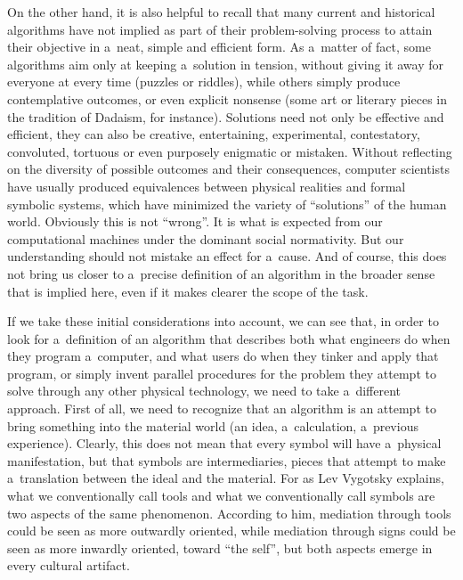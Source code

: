 On the other hand, it is also helpful to recall that many current and historical algorithms have not implied as part of their problem-solving process to attain their objective in a~neat, simple and efficient form. As a~matter of fact, some algorithms aim only at keeping a~solution in tension, without giving it away for everyone at every time (puzzles or riddles), while others simply produce contemplative outcomes, or even explicit nonsense (some art or literary pieces in the tradition of Dadaism, for instance). Solutions need not only be effective and efficient, they can also be creative, entertaining, experimental, contestatory, convoluted, tortuous or even purposely enigmatic or mistaken. Without reflecting on the diversity of possible outcomes and their consequences, computer scientists have usually produced equivalences between physical realities and formal symbolic systems, which have minimized the variety of ``solutions'' of the human world. Obviously this is not ``wrong''. It is what is expected from our computational machines under the dominant social normativity. But our understanding should not mistake an effect for a~cause. And of course, this does not bring us closer to a~precise definition of an algorithm in the broader sense that is implied here, even if it makes clearer the scope of the task.

If we take these initial considerations into account, we can see that, in order to look for a~definition of an algorithm that describes both what engineers do when they program a~computer, and what users do when they tinker and apply that program, or simply invent parallel procedures for the problem they attempt to solve through any other physical technology, we need to take a~different approach. First of all, we need to recognize that an algorithm is an attempt to bring something into the material world (an idea, a~calculation, a~previous experience). Clearly, this does not mean that every symbol will have a~physical manifestation, but that symbols are intermediaries, pieces that attempt to make a~translation between the ideal and the material. For as Lev Vygotsky
\parencite*[][]{vygotsky_tool_1978} %
 explains, what we conventionally call tools and what we conventionally call symbols are two aspects of the same phenomenon. According to him, mediation through tools could be seen as more outwardly oriented, while mediation through signs could be seen as more inwardly oriented, toward ``the self'', but both aspects emerge in every cultural artifact.

